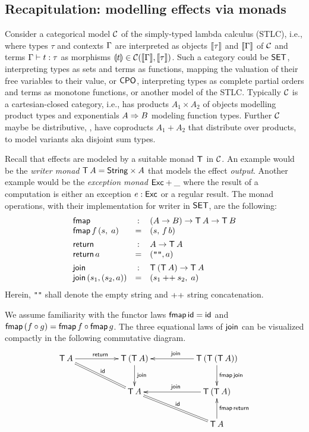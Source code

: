 \documentclass[acmsmall,review,anonymous]{acmart}\settopmatter{printfolios=true,printccs=false,printacmref=false}
\begin{document}
\subsection{Recapitulation: modelling effects via monads}

Consider a categorical model $\mathcal{C}$ of the simply-typed lambda calculus
(STLC), i.e., where types $\tau$ and contexts $\Gamma$ are interpreted as
objects $\llbracket\tau\rrbracket$ and $\llbracket\Gamma\rrbracket$ of $\mathcal{C}$ and terms
$\Gamma \vdash t : \tau$ as morphisms $\llparenthesis t\rrparenthesis \in \mathcal{C}(\llbracket\Gamma\rrbracket,\llbracket\tau\rrbracket)$.
Such a category could be $\mathsf{SET}$, interpreting types as sets and terms
as functions, mapping the valuation of their free variables to their
value, or $\mathsf{CPO}$, interpreting types as complete partial orders and
terms as monotone functions, or another model of the STLC.
Typically $\mathcal{C}$ is a cartesian-closed category, i.e., has products
$A_1 \times A_2$ of objects modelling product types and exponentials $A \Rightarrow
B$ modeling function types.  Further $\mathcal{C}$ maybe be distributive,
\ie, have coproducts $A_1 + A_2$ that distribute over products, to
model variants aka disjoint sum types.

Recall that effects are modeled by a suitable monad $\mathsf{T}_{}$ in
$\mathcal{C}$.  An example would be the \emph{writer monad} $\mathsf{T}_{}\,A = \mathsf{String} \times
A$ that models the effect \emph{output}.
Another example would be the \emph{exception monad} $\mathsf{Exc} + \_$ where
the result of a computation is either an exception $e : \mathsf{Exc}$ or a
regular result.
The monad operations, with
their implementation for writer in $\mathsf{SET}$, are the following:
\[
\begin{array}{lcl}
\tfmap & : & (A \to B) \to \T\,A \to \T\,B \\
\tfmap\, f\, (s,\; a) & = & (s,\, f\, b)
\\[1ex]
\treturn & : & A \to \T\,A \\
\treturn\, a & = & (\verb|""|, a)
\\[1ex]
\tjoin & : & \T\,(\T\,A) \to \T\,A \\
\tjoin\,(s_1,(s_2,a)) & = & (s_1 \append s_2,\; a) \\
\end{array}
\]
Herein, \verb|""| shall denote the empty string and $\mathbin{\mathtt{++}}$ string
concatenation.

We assume familiarity with the functor laws $\mathsf{fmap}\,\mathsf{id} = \mathsf{id}$ and
$\mathsf{fmap}\,(f \circ g) = \mathsf{fmap}\,f \circ \mathsf{fmap}\,g$.
The three equational
laws of $\mathsf{join}$ can be visualized compactly in the following
commutative diagram.
\[
\xymatrix@C=12ex{
  \T\,A     \ar[r]^{\treturn} \ar@{=}[dr]^{\tid}
& \T\,(\T\,A) \ar[d]^{\tjoin}
& \T\,(\T\,(\T\,A)) \ar[l]_{\tjoin} \ar[d]^{\tfmap\,\tjoin}
\\
& \T\,A       \ar@{=}[dr]^{\tid}
& \T\,(\T\,A) \ar[l]_{\tjoin}
\\
&
& \T\,A \ar[u]_{\tfmap\,\treturn}
}
\]
\end{document}
